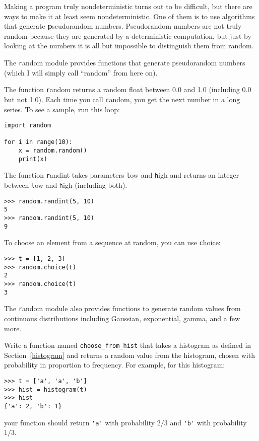 \documentclass[
DIV=11,
fontsize=12,
twoside,
headinclude=false,
titlepage=firstiscover,
abstract=true,
headsepline=true,
footsepline=true,
chapterprefix=true, %
headings=big,
bibliography=totoc,%
captions=tableheading
]{scrbook}
\theoremstyle{definition}
\begin{document}
Making a program truly nondeterministic turns out to be difficult,
but there are ways to make it at least seem nondeterministic.  One of
them is to use algorithms that generate {\textbf pseudorandom} numbers.
Pseudorandom numbers are not truly random because they are generated
by a deterministic computation, but just by looking at the numbers it
is all but impossible to distinguish them from random.

The {\texttt random} module provides functions that generate
pseudorandom numbers (which I will simply call ``random'' from
here on).

The function {\texttt random} returns a random float
between 0.0 and 1.0 (including 0.0 but not 1.0).  Each time you
call {\texttt random}, you get the next number in a long series.  To see a
sample, run this loop:

\begin{lstlisting}
import random

for i in range(10):
    x = random.random()
    print(x)
\end{lstlisting}
%
The function {\texttt randint} takes parameters {\texttt low} and
{\texttt high} and returns an integer between {\texttt low} and
{\texttt high} (including both).

\begin{lstlisting}
>>> random.randint(5, 10)
5
>>> random.randint(5, 10)
9
\end{lstlisting}
%
To choose an element from a sequence at random, you can use
{\texttt choice}:

\begin{lstlisting}
>>> t = [1, 2, 3]
>>> random.choice(t)
2
>>> random.choice(t)
3
\end{lstlisting}
%
The {\texttt random} module also provides functions to generate
random values from continuous distributions including
Gaussian, exponential, gamma, and a few more.

\begin{exercise}
\normalfont
{}

Write a function named \verb"choose_from_hist" that takes
a histogram as defined in Section~\ref{histogram} and returns a 
random value from the histogram, chosen with probability
in proportion to frequency.  For example, for this histogram:

\begin{lstlisting}
>>> t = ['a', 'a', 'b']
>>> hist = histogram(t)
>>> hist
{'a': 2, 'b': 1}
\end{lstlisting}
%
your function should return \verb"'a'" with probability $2/3$ and \verb"'b'"
with probability $1/3$.
\end{exercise}
\end{document}
